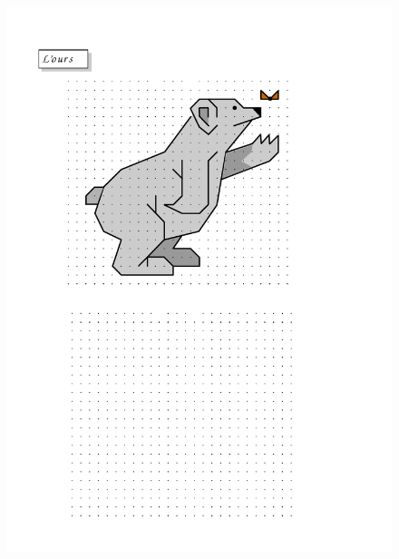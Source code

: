 \begin{figure}[H]
  \centering
  \includegraphics[width=\linewidth]{sources/pages/1.1.1/5-ours.pdf}
  \caption{\label{geo-commencer}}
\end{figure}

